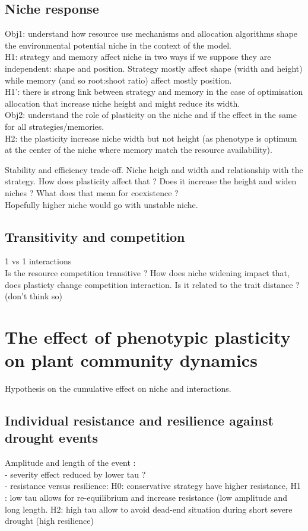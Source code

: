\documentclass[english,10pt]{article}
\begin{document}
\subsection{Niche response}
Obj1: understand how resource use mechanisms and allocation algorithms shape the environmental potential niche in the context of the model.\\
H1: strategy and memory affect niche in two ways if we suppose they are independent: shape and position. Strategy mostly affect shape (width and height) while memory (and so root:shoot ratio) affect mostly position.\\
H1': there is strong link between strategy and memory in the case of optimisation allocation that increase niche height and might reduce its width.\\
Obj2: understand the role of plasticity on the niche and if the effect in the same for all strategies/memories.\\
H2: the plasticity increase niche width but not height (as phenotype is optimum at the center of the niche where memory match the resource availability).

Stability and efficiency trade-off. Niche heigh and width and relationship with the strategy. How does plasticity affect that ? Does it increase the height and widen niches ? What does that mean for coexistence ?\\
Hopefully higher niche would go with unstable niche.

\subsection{Transitivity and competition}
1 vs 1 interactions\\
Is the resource competition transitive ? How does niche widening impact that, does plasticty change competition interaction. Is it related to the trait distance ? (don't think so)

\section{The effect of phenotypic plasticity on plant community dynamics}
Hypothesis on the cumulative effect on niche and interactions.

\subsection{Individual resistance and resilience against drought events}
Amplitude and length of the event :\\
- severity effect reduced by lower tau ?\\
- resistance versus resilience: H0: conservative strategy have higher resistance, H1 : low tau allows for re-equilibrium and increase resistance (low amplitude and long length. H2: high tau allow to avoid dead-end situation during short severe drought (high resilience)
\end{document}
